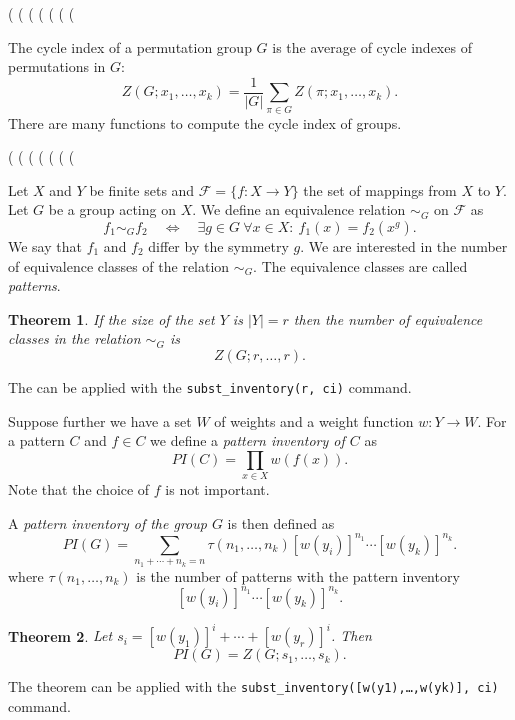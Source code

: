 \documentclass[10pt]{article}
\newcommand{\command}[1]{\texttt{#1}}
\newcommand{\DEF}[1]{{\em #1}}
\newtheorem{theorem}{Theorem}
\begin{document}
\begin{example}
(%
(%
(%
(%
(%
(%
(%
\end{example} 
%
The cycle index of a permutation group $G$ is the average of cycle
indexes of permutations in $G$:
$$
Z(G;x_1,\ldots,x_k) = \frac{1}{|G|}\sum_{\pi\in G}Z(\pi; x_1,\ldots,x_k).
$$
There are many functions to compute the cycle index of groups.
\begin{example}
(%
(%
(%
(%
(%
(%
(%
\end{example}
%
Let $X$ and $Y$ be finite sets and $\mathcal{F}=\{f:X\to Y\}$ the set
of mappings from $X$ to $Y$. Let $G$ be a group acting on $X$. We
define an equivalence relation $\sim_G$ on $\mathcal{F}$ as
$$
f_1 \sim_G f_2 \quad \Longleftrightarrow \quad
\mbox{$\exists g\in G\ \forall x\in X: \ f_1(x)=f_2(x^g)$.}
$$
We say that $f_1$ and $f_2$ differ by the symmetry $g$. We are
interested in the number of equivalence classes of the relation
$\sim_G$. The equivalence classes are called \DEF{patterns}.

\begin{theorem}
\label{thm:polya1}
If the size of the set $Y$ is $|Y|=r$ then the number of equivalence
classes in the relation $\sim_G$ is
$$
Z(G; r,\ldots, r).
$$
\end{theorem}
The can be applied with the \command{subst\_inventory(r, ci)} command.

Suppose further we have a set $W$ of weights and a weight function
$w:Y\to W$. For a pattern $C$ and $f\in C$ we define a \DEF{pattern
  inventory of $C$} as
$$
PI(C) = \prod_{x\in X} w(f(x)).
$$
Note that the choice of $f$ is not important.

A \DEF{pattern inventory of the group $G$} is then defined as
$$
PI(G) = \sum_{n_1+\cdots+n_k=n}\tau(n_1,\ldots, n_k)[w(y_i)]^{n_1}\cdots [w(y_k)]^{n_k}.
$$
where $\tau(n_1,\ldots,n_k)$ is the number of patterns with the
pattern inventory
$$
[w(y_i)]^{n_1}\cdots [w(y_k)]^{n_k}.
$$

\begin{theorem}
\label{thm:polya2}
Let $s_i=[w(y_1)]^i+\cdots+[w(y_r)]^i$. Then
$$
PI(G) = Z(G; s_1,\ldots, s_k).
$$
\end{theorem}
The theorem can be applied with the
\command{subst\_inventory([w(y1),\ldots,w(yk)], ci)} command.
\end{document}
